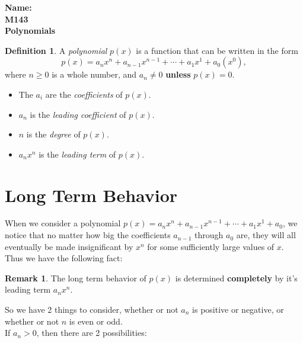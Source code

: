 \documentclass[10pt]{article}
\theoremstyle{definition}
\newtheorem{definition}[equation]{Definition}
\newtheorem{remark}[equation]{Remark}
\begin{document}
%

{\bf Name:} \hrulefill\hrulefill\hrulefill\\
{\bf M143} \qquad \qquad \\
{\bf Polynomials}\\ %
\begin{definition}
A \textit{polynomial} $p(x)$ is a function that can be written in the form $$p(x)=a_nx^n+a_{n-1}x^{n-1}+\cdots+a_1x^1+a_0(x^0),$$ where $n\geq 0$ is a whole number, and $a_n\neq 0$ \textbf{unless} $p(x)=0$.

\begin{itemize}
\item The $a_i$ are the \textit{coefficients} of $p(x)$.
\item $a_n$ is the \textit{leading coefficient} of $p(x)$.
\item $n$ is the \textit{degree} of $p(x)$.
\item $a_nx^n$ is the \textit{leading term}  of $p(x)$.
\end{itemize}


\end{definition}

\section{Long Term Behavior}

When we consider a polynomial $p(x)=a_nx^n+a_{n-1}x^{n-1}+\cdots+a_1x^1+a_0$, we notice that no matter how big the coefficients $a_{n-1}$ through $a_0$ are, they will all eventually be made insignificant by $x^n$ for some sufficiently large values of $x$.  Thus we have the following fact:

\begin{remark}
The long term behavior of $p(x)$ is determined \textbf{completely} by it's leading term $a_nx^n$.
\end{remark}

So we have 2 things to consider, whether or not $a_n$ is positive or negative, or whether or not $n$ is even or odd. \\

If $a_n>0$, then there are 2 possibilities:
\end{document}
